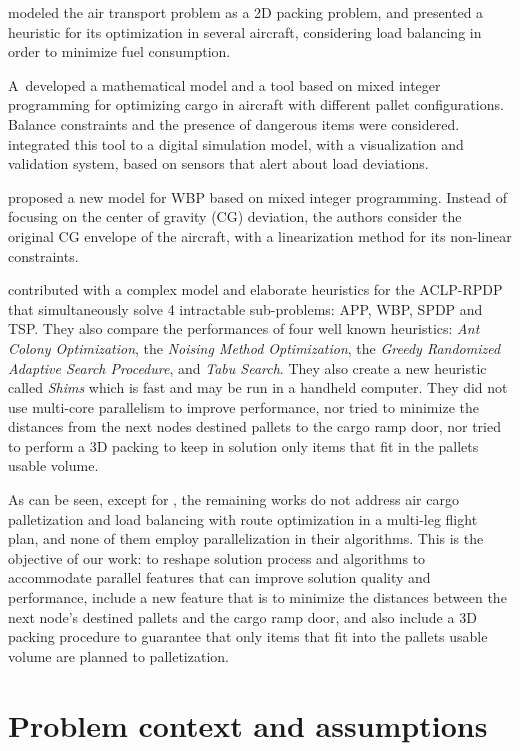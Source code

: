 \documentclass[preprint,authoryear]{elsarticle}
\begin{document}
\cite{YangLiuGao2018} modeled the air transport problem as a 2D packing problem, and presented a heuristic for its optimization in several aircraft, considering load balancing in order to minimize fuel consumption.

\cite{wong2020}A developed a mathematical model and a tool based on mixed integer programming for optimizing cargo in aircraft with different pallet configurations. Balance constraints and the presence of dangerous items were considered. \cite{eugene2021} integrated this tool to a digital simulation model, with a visualization and validation system, based on sensors that alert about load deviations.

\cite{zhao2021} proposed a new model for WBP based on mixed integer programming. Instead of focusing on the center of gravity (CG) deviation, the authors consider the original CG envelope of the aircraft, with a linearization method for its non-linear constraints.

\cite{MesquitaSanches2023} contributed with a complex model and elaborate heuristics for the ACLP-RPDP that simultaneously solve 4 intractable sub-problems: APP, WBP, SPDP and TSP. They also compare the performances of four well known heuristics: {\it Ant Colony Optimization}, the {\it Noising Method Optimization}, the {\it Greedy Randomized Adaptive Search Procedure}, and {\it Tabu Search}. They also create a new heuristic called {\it Shims} which is fast and may be run in a handheld computer. They did not use multi-core parallelism to improve performance, nor tried to minimize the distances from the next nodes destined pallets to the cargo ramp door, nor tried to perform a 3D packing to keep in solution only items that fit in the pallets usable volume.

As can be seen, except for \cite{MesquitaSanches2023}, the remaining works do not address air cargo palletization and load balancing with route optimization in a multi-leg flight plan, and none of them employ parallelization in their algorithms. This is the objective of our work: to reshape \cite{MesquitaSanches2023} solution process and algorithms to accommodate parallel features that can improve solution quality and performance, include a new feature that is to minimize the distances between the next node's destined pallets and the cargo ramp door, and also include a 3D packing procedure to guarantee that only items that fit into the pallets usable volume are planned to palletization.


\section{Problem context and assumptions}
\label{sec3}
\end{document}
